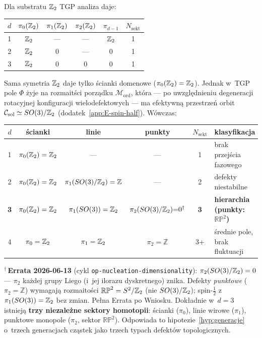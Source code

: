 \begin{remark}[Wzmocnienie ilo\'sciowe argumentu za $d = 3$]
Dla substratu $\mathbb{Z}_2$ TGP analiza daje:
\begin{center}
\renewcommand{\arraystretch}{1.25}
\begin{tabular}{c|cccc|c}
\toprule
$d$ & $\pi_0(\mathbb{Z}_2)$ & $\pi_1(\mathbb{Z}_2)$ & $\pi_2(\mathbb{Z}_2)$
    & $\pi_{d-1}$ & $N_{\mathrm{sekt}}$ \\
\midrule
1 & $\mathbb{Z}_2$ & ---  & ---  & $\mathbb{Z}_2$ & 1 \\
2 & $\mathbb{Z}_2$ & $0$  & ---  & $0$ & 1 \\
\midrule
3 & $\mathbb{Z}_2$ & $0$  & $0$  & $0$ & 1 \\
\bottomrule
\end{tabular}
\end{center}
Sama symetria $\mathbb{Z}_2$ daje tylko \'scianki domenowe
($\pi_0(\mathbb{Z}_2) = \mathbb{Z}_2$). Jednak w~TGP pole $\Phi$ \.zyje
na rozmait\'sci porz\k{a}dku $\mathcal{M}_{\mathrm{ord}}$,
kt\'ora --- po uwzgl\k{e}dnieniu degeneracji rotacyjnej
konfiguracji wielodefektowych --- ma efektywn\k{a} przestrze\'n
orbit $\mathcal{C}_{\mathrm{sol}} \simeq SO(3)/\mathbb{Z}_2$
(dodatek~\ref{app:E-spin-half}). W\'owczas:
\begin{center}
\renewcommand{\arraystretch}{1.25}
\begin{tabular}{c|ccc|c|l}
\toprule
$d$ & \'scianki & linie & punkty &
$N_{\mathrm{sekt}}$ & klasyfikacja \\
\midrule
1 & $\pi_0(\mathbb{Z}_2) = \mathbb{Z}_2$ & --- & --- & 1
  & brak przej\'scia fazowego \\
2 & $\pi_0(\mathbb{Z}_2) = \mathbb{Z}_2$ &
    $\pi_1(SO(3)/\mathbb{Z}_2) = \mathbb{Z}$ & ---
  & 2 & defekty niestabilne \\
\textbf{3} & $\pi_0(\mathbb{Z}_2) = \mathbb{Z}_2$ &
    $\pi_1(SO(3)) = \mathbb{Z}_2$ &
    $\pi_2(SO(3)/\mathbb{Z}_2){=}0^{\dagger}$ &
  \textbf{3} & \textbf{hierarchia (punkty: $\mathbb{RP}^2$)} \\
4 & $\pi_0 = \mathbb{Z}_2$ & $\pi_1 = \mathbb{Z}_2$ &
    $\pi_2 = \mathbb{Z}$ & 3+
  & \'srednie pole, brak fluktuacji \\
\bottomrule
\end{tabular}
\end{center}
{\small ${}^{\dagger}$\,\textbf{Errata 2026-06-13}
(cykl \texttt{op-nucleation-dimensionality}): $\pi_2(SO(3)/\mathbb{Z}_2) = 0$ ---
$\pi_2$ ka\.zdej grupy Liego (i~jej ilorazu dyskretnego) znika. Defekty
\emph{punktowe} ($\pi_2 = \mathbb{Z}$) wymagaj\k{a} rozmaito\'sci
$\mathbb{RP}^2 = S^2/\mathbb{Z}_2$ (nie $SO(3)/\mathbb{Z}_2$); spin-$\tfrac12$ z~$\pi_1(SO(3)) = \mathbb{Z}_2$
bez zmian. Pe\l{}na Errata po Wniosku.}
Dok\l{}adnie w~$d = 3$ istniej\k{a} \textbf{trzy niezale\.zne
sektory homotopii}: \'scianki ($\pi_0$), linie wirowe ($\pi_1$),
punktowe monopole ($\pi_2$, sektor $\mathbb{RP}^2$). Odpowiada to hipotezie~\ref{hyp:generacje}
o~trzech generacjach cz\k{a}stek jako trzech typach defekt\'ow
topologicznych.


\end{remark}
